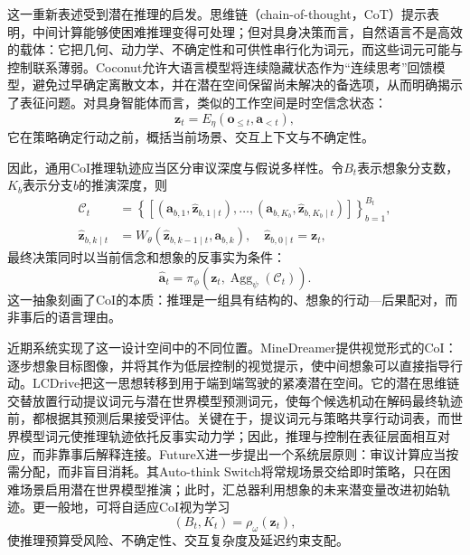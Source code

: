 这一重新表述受到潜在推理的启发。思维链（chain-of-thought，CoT）提示表明，中间计算能够使困难推理变得可处理\citep{wei2022chain}；但对具身决策而言，自然语言不是高效的载体：它把几何、动力学、不确定性和可供性串行化为词元，而这些词元可能与控制联系薄弱。Coconut允许大语言模型将连续隐藏状态作为“连续思考”回馈模型，避免过早确定离散文本，并在潜在空间保留尚未解决的备选项，从而明确揭示了表征问题\citep{hao2024coconut}。对具身智能体而言，类似的工作空间是时空信念状态：
\begin{equation}
    \mathbf{z}_t
    =
    E_\eta(\mathbf{o}_{\le t},\mathbf{a}_{<t}),
\end{equation}
它在策略确定行动之前，概括当前场景、交互上下文与不确定性。

因此，通用CoI推理轨迹应当区分审议深度与假说多样性。令$B_t$表示想象分支数，$K_b$表示分支$b$的推演深度，则
\begin{equation}
  \begin{aligned}
    \mathcal{C}_t &=
    \left\{
    \left[
    (\mathbf{a}_{b,1}, \widehat{\mathbf{z}}_{b,1\mid t}),
    \ldots,
    (\mathbf{a}_{b,K_b}, \widehat{\mathbf{z}}_{b,K_b\mid t})
    \right]
    \right\}_{b=1}^{B_t},
    \\[3pt]
    \widehat{\mathbf{z}}_{b,k\mid t}
    &=
    W_\theta(\widehat{\mathbf{z}}_{b,k-1\mid t}, \mathbf{a}_{b,k}),
    \quad
    \widehat{\mathbf{z}}_{b,0\mid t}=\mathbf{z}_t ,
  \end{aligned}
\end{equation}
最终决策同时以当前信念和想象的反事实为条件：
\begin{equation}
    \widehat{\mathbf{a}}_t
    =
    \pi_\phi\!\left(
    \mathbf{z}_t,
    \operatorname{Agg}_\psi(\mathcal{C}_t)
    \right).
\end{equation}
这一抽象刻画了CoI的本质：推理是一组具有结构的、想象的行动—后果配对，而非事后的语言理由。

近期系统实现了这一设计空间中的不同位置。MineDreamer提供视觉形式的CoI：逐步想象目标图像，并将其作为低层控制的视觉提示，使中间想象可以直接指导行动\citep{zhou2024minedreamer}。LCDrive把这一思想转移到用于端到端驾驶的紧凑潜在空间。它的潜在思维链交替放置行动提议词元与潜在世界模型预测词元，使每个候选机动在解码最终轨迹前，都根据其预测后果接受评估\citep{tan2025lcdrive}。关键在于，提议词元与策略共享行动词表，而世界模型词元使推理轨迹依托反事实动力学；因此，推理与控制在表征层面相互对应，而非靠事后解释连接。FutureX进一步提出一个系统层原则：审议计算应当按需分配，而非盲目消耗。其Auto-think Switch将常规场景交给即时策略，只在困难场景启用潜在世界模型推演；此时，汇总器利用想象的未来潜变量改进初始轨迹\citep{lin2025futurex}。更一般地，可将自适应CoI视为学习
\begin{equation}
    (B_t,K_t)=\rho_\omega(\mathbf{z}_t),
\end{equation}
使推理预算受风险、不确定性、交互复杂度及延迟约束支配。

